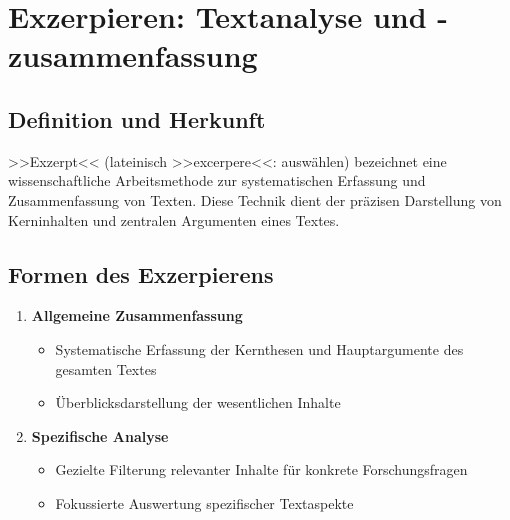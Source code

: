 \documentclass{vorlage-design-main}
\title{}
\author{Jan Unger}
\date{\today}
\begin{document}
\maketitle

\begin{abstract}



\end{abstract}

\section{Exzerpieren: Textanalyse und
-zusammenfassung}\label{exzerpieren-textanalyse-und--zusammenfassung}

\subsection{Definition und Herkunft}\label{definition-und-herkunft}

>>Exzerpt<< (lateinisch >>excerpere<<: auswählen) bezeichnet eine
wissenschaftliche Arbeitsmethode zur systematischen Erfassung und
Zusammenfassung von Texten. Diese Technik dient der präzisen Darstellung
von Kerninhalten und zentralen Argumenten eines Textes.

\subsection{Formen des Exzerpierens}\label{formen-des-exzerpierens}

\begin{enumerate}
\def\labelenumi{\arabic{enumi}.}

\item
  \textbf{Allgemeine Zusammenfassung}

  \begin{itemize}

  \item
    Systematische Erfassung der Kernthesen und Hauptargumente des
    gesamten Textes
  \item
    Überblicksdarstellung der wesentlichen Inhalte
  \end{itemize}
\item
  \textbf{Spezifische Analyse}

  \begin{itemize}

  \item
    Gezielte Filterung relevanter Inhalte für konkrete Forschungsfragen
  \item
    Fokussierte Auswertung spezifischer Textaspekte
  \end{itemize}
\end{enumerate}
\end{document}
